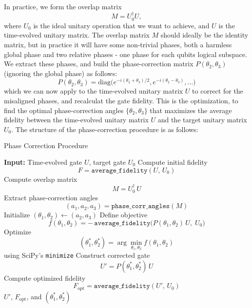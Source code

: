 \documentclass{subfiles}
\begin{document}
In practice, we form the overlap matrix 
\begin{equation*}
  M = U_0^\dagger U,
\end{equation*}
where $U_0$ is the ideal unitary operation that we want to achieve, and $U$ is the time-evolved unitary matrix. The overlap matrix $M$ should ideally be the identity matrix, but in practice it will have some non-trivial phases, both a harmless global phase and two relative phases - one phase for each qubits logical subspace. We extract these phases, and build the phase-correction matrix $P(\theta_2, \theta_3)$ (ignoring the global phase) as follows:
\begin{equation*}
    P(\theta_2, \theta_3) = \text{diag}\bigg(e^{-i(\theta_2 + \theta_3)/2}, e^{-i(\theta_2 - \theta_3)},\dots\bigg)
\end{equation*}
which we can now apply to the time-evolved unitary matrix $U$ to correct for the misaligned phases, and recalculat the gate fidelity. This is the optimization, to find the optimal phase-correction angles $\{\theta_2, \theta_3\}$ that maximizes the average fidelity between the time-evolved unitary matrix $U$ and the target unitary matrix $U_0$.
The structure of the phase-correction procedure is as follows:
\begin{algorithm}[H]
\caption{Phase Correction Procedure}
\label{alg:phase_correction}
\begin{algorithmic}[1]
  \State \textbf{Input:} Time‐evolved gate $U$, target gate $U_0$
  \State Compute initial fidelity 
    \[
      F = \texttt{average\_fidelity}(U,\,U_0)
    \]
  \State Compute overlap matrix 
    \[
      M = U_{0}^{\dagger}\,U
    \]
  \State Extract phase‐correction angles 
    \[
      (a_1,a_2,a_3) = \texttt{phase\_corr\_angles}(M)
    \]
  \State Initialize $(\theta_1,\theta_2) \leftarrow (a_2,a_3)$
  \State Define objective
    \[
      f(\theta_1,\theta_2)
      = -\,\texttt{average\_fidelity}\bigl(P(\theta_1,\theta_2)\,U,\;U_0\bigr)
    \]
  \State Optimize 
    \[
      (\theta_1^*,\theta_2^*)
      = \arg\min_{\theta_1,\theta_2} f(\theta_1,\theta_2)
    \]
    using SciPy’s \texttt{minimize}
  \State Construct corrected gate 
    \[
      U' = P(\theta_1^*,\theta_2^*) \, U
    \]
  \State Compute optimized fidelity 
    \[
      F_{\mathrm{opt}} = \texttt{average\_fidelity}(U',\,U_0)
    \]
  \State \Return $U'$, $F_{\mathrm{opt}}$, and $(\theta_1^*,\theta_2^*)$
\end{algorithmic}
\end{algorithm}
\end{document}
